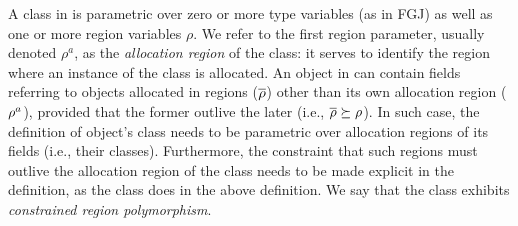 A class in \FB is parametric over zero or more type variables (as
in FGJ) as well as one or more region variables $\rho$.
We refer to the first region parameter, usually denoted $\rho^a$, as
the \emph{allocation region} of the class: it serves to identify the
region where an instance of the class is allocated.
%
An object in \FB can contain fields referring to objects allocated in regions ($\overline{\rho}$) other than its
own allocation region ($\rho^a$), provided that the former outlive
the later (i.e., $\overline{\rho} \succeq \rho$). In such case, the
definition of object's class needs to be parametric over allocation
regions of its fields (i.e., their classes). Furthermore, the
constraint that such regions must outlive the allocation region of the
class needs to be made explicit in the definition, as the 
class does in the above definition. We say that the  class
exhibits \emph{constrained region polymorphism}.
%

